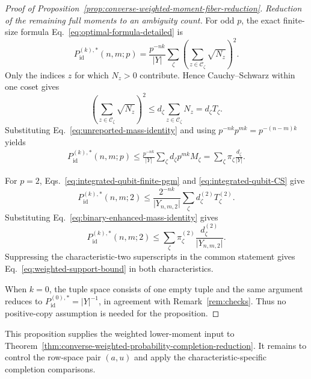 \documentclass[11pt]{article}
\newcommand{\1}{\mathbf 1}
\theoremstyle{plain}
\theoremstyle{definition}
\theoremstyle{remark}
\begin{document}
\begin{proof}[Proof of Proposition~\ref{prop:converse-weighted-moment-fiber-reduction}]
\smallskip
\noindent\emph{Reduction of the remaining full moments to an ambiguity count.}
For odd $p$, the exact finite-size formula
Eq.~\eqref{eq:optimal-formula-detailed} is
\begin{equation}
 P_{\mathrm{id}}^{(k),*}(n,m;p)
 =\frac{p^{-nk}}{\lvert Y\rvert}\sum_{\zeta}
 \left(\sum_{z\in\mathcal C_{\zeta}}\sqrt{N_z}\right)^2.
 \label{eq:weighted-bound-starting-formula}
\end{equation}
Only the indices $z$ for which $N_z>0$ contribute.  Hence
Cauchy--Schwarz within one coset gives
\begin{equation}
 \left(\sum_{z\in\mathcal C_{\zeta}}\sqrt{N_z}\right)^2
 \le d_{\zeta}\sum_{z\in\mathcal C_{\zeta}}N_z
 =d_{\zeta}T_{\zeta}.
 \label{eq:weighted-bound-coset-CS}
\end{equation}
Substituting Eq.~\eqref{eq:unreported-mass-identity} and using
$p^{-nk}p^{mk}=p^{-(n-m)k}$ yields
\begin{align}
 P_{\mathrm{id}}^{(k),*}(n,m;p)
 \le\frac{p^{-nk}}{\lvert Y\rvert}
 \sum_{\zeta}d_{\zeta}p^{mk}M_{\zeta}
 =\sum_{\zeta}\pi_{\zeta}\frac{d_{\zeta}}{\lvert Y\rvert}.
 \label{eq:weighted-support-bound-odd-proof}
\end{align}

For $p=2$, Eqs.~\eqref{eq:integrated-qubit-finite-pgm} and
\eqref{eq:integrated-qubit-CS} give
\begin{equation}
 P_{\mathrm{id}}^{(k),*}(n,m;2)
 \le\frac{2^{-nk}}{\lvert Y_{n,m,2}\rvert}
 \sum_{\zeta}d_{\zeta}^{(2)}T_{\zeta}^{(2)}.
 \label{eq:binary-weighted-bound-before-mass}
\end{equation}
Substituting Eq.~\eqref{eq:binary-enhanced-mass-identity} gives
\begin{equation}
 P_{\mathrm{id}}^{(k),*}(n,m;2)
 \le\sum_{\zeta}\pi_{\zeta}^{(2)}
 \frac{d_{\zeta}^{(2)}}{\lvert Y_{n,m,2}\rvert}.
 \label{eq:binary-weighted-coset-bound}
\end{equation}
Suppressing the characteristic-two superscripts in the common statement gives
Eq.~\eqref{eq:weighted-support-bound} in both characteristics.

When $k=0$, the tuple space consists of one empty tuple and the same argument
reduces to $P_{\mathrm{id}}^{(0),*}=\lvert Y\rvert^{-1}$, in agreement with
Remark~\ref{rem:checks}.  Thus no positive-copy assumption is needed for the
proposition.
\end{proof}

This proposition supplies the weighted lower-moment input to
Theorem~\ref{thm:converse-weighted-probability-completion-reduction}.  It
remains to control the row-space pair $(a,u)$ and apply the
characteristic-specific completion comparisons.
\end{document}
